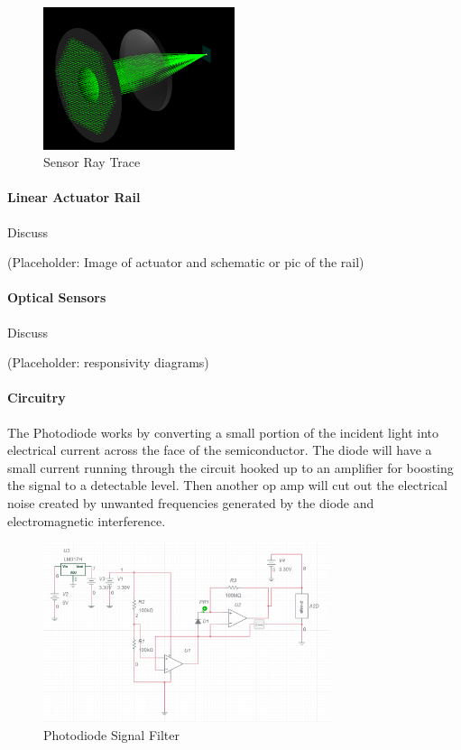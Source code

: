 \begin{figure}[H]
    \caption{Sensor Ray Trace}
    \centering
    \includegraphics[width=0.5\textwidth]{images/ColimatedBeam.png}
\end{figure}

\paragraph{Linear Actuator Rail} Discuss

(Placeholder: Image of actuator and schematic or pic of the rail)

\paragraph{Optical Sensors} Discuss

(Placeholder: responsivity diagrams)

\paragraph{Circuitry} The Photodiode works by converting a small portion of the incident light into electrical current across the face of the semiconductor. The diode will have a small current running through the circuit hooked up to an amplifier for boosting the signal to a detectable level. Then another op amp will cut out the electrical noise created by unwanted frequencies generated by the diode and electromagnetic interference.

\begin{figure}[H]
    \caption{Photodiode Signal Filter}
    \centering
    \includegraphics[width=0.75\textwidth]{images/ElectricalSignalFilteringSD1.png}
\end{figure}


